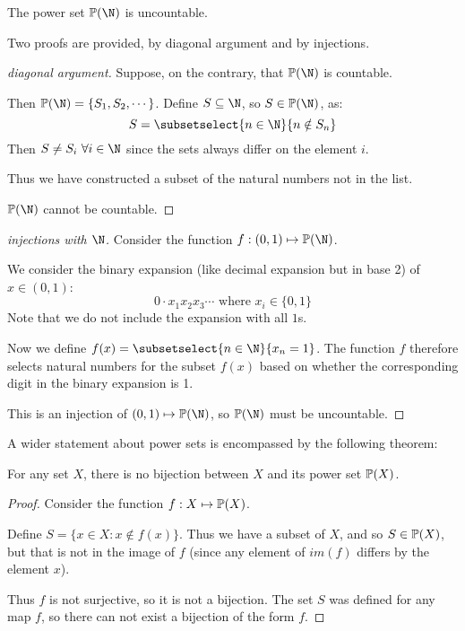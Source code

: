 \documentclass[../Main.tex]{subfiles}
\begin{document}
\begin{theorem}
    The power set $\powerset{\N}$ is uncountable.
    \label{thmPowerSetNUncountable}
\end{theorem}
Two proofs are provided, by diagonal argument and by injections.
\begin{proof}[diagonal argument]
    Suppose, on the contrary, that $\powerset{\N}$ is countable.\par
    Then $\powerset{\N} = \{S_1, S_2, \cdots\}$.
    Define $S \subseteq \N$, so $S \in \powerset{\N}$, as:
    \begin{equation*}
        S = \subsetselect{n \in \N}{n \notin S_n}
    \end{equation*}
    Then $S \neq S_i~\forall i \in \N$ since the sets always differ on the element $i$.\par
    Thus we have constructed a subset of the natural numbers not in the list.\contradiction\par
    $\powerset{\N}$ cannot be countable.
\end{proof}
\begin{proof}[injections with $\N$]
    Consider the function $f : (0, 1) \mapsto \powerset{\N}$.\par
    We consider the binary expansion (like decimal expansion but in base 2) of $x \in (0, 1)$:
    \begin{equation*}
        0 \cdot x_1 x_2 x_3 \cdots \text{ where } x_i \in \{0, 1\}
    \end{equation*}
    Note that we do not include the expansion with all $1$s.\par
    Now we define $f(x) = \subsetselect{n \in \N}{x_n = 1}$. The function $f$ therefore selects natural numbers for the subset $f(x)$ based on whether the corresponding digit in the binary expansion is 1.\par
    This is an injection of $(0, 1) \mapsto \powerset{\N}$, so $\powerset{\N}$ must be uncountable.
\end{proof}
A wider statement about power sets is encompassed by the following theorem:
\begin{theorem}
    For any set $X$, there is no bijection between $X$ and its power set $\mathbb{P}(X)$.
    \label{thmNoPowerSetBijections}
\end{theorem}
\begin{proof}
    Consider the function $f : X \mapsto \mathbb{P}(X)$.\par
    Define $S = \{x \in X : x \notin f(x)\}$.
    Thus we have a subset of $X$, and so $S \in \mathbb{P}(X)$, but that is not in the image of $f$ (since any element of $im(f)$ differs by the element $x$).\par
    Thus $f$ is not surjective, so it is not a bijection. The set $S$ was defined for any map $f$, so there can not exist a bijection of the form $f$.
\end{proof}
\end{document}
